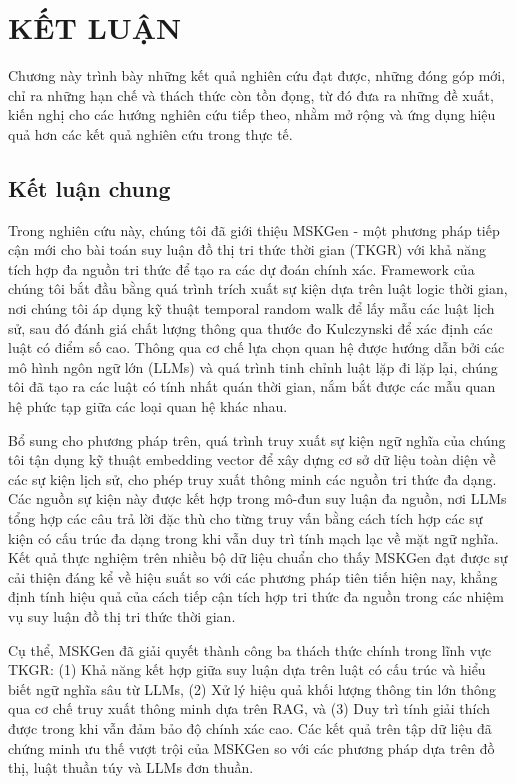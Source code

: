 \chapter{KẾT LUẬN}
\label{Chapter6}

Chương này trình bày những kết quả nghiên cứu đạt được, những đóng góp mới, chỉ ra những hạn chế và thách thức còn tồn đọng, từ đó đưa ra những đề xuất, kiến nghị cho các hướng nghiên cứu tiếp theo, nhằm mở rộng và ứng dụng hiệu quả hơn các kết quả nghiên cứu trong thực tế.

\section{Kết luận chung}
Trong nghiên cứu này, chúng tôi đã giới thiệu MSKGen - một phương pháp tiếp cận mới cho bài toán suy luận đồ thị tri thức thời gian (TKGR) với khả năng tích hợp đa nguồn tri thức để tạo ra các dự đoán chính xác. Framework của chúng tôi bắt đầu bằng quá trình trích xuất sự kiện dựa trên luật logic thời gian, nơi chúng tôi áp dụng kỹ thuật temporal random walk để lấy mẫu các luật lịch sử, sau đó đánh giá chất lượng thông qua thước đo Kulczynski để xác định các luật có điểm số cao. Thông qua cơ chế lựa chọn quan hệ được hướng dẫn bởi các mô hình ngôn ngữ lớn (LLMs) và quá trình tinh chỉnh luật lặp đi lặp lại, chúng tôi đã tạo ra các luật có tính nhất quán thời gian, nắm bắt được các mẫu quan hệ phức tạp giữa các loại quan hệ khác nhau.

Bổ sung cho phương pháp trên, quá trình truy xuất sự kiện ngữ nghĩa của chúng tôi tận dụng kỹ thuật embedding vector để xây dựng cơ sở dữ liệu toàn diện về các sự kiện lịch sử, cho phép truy xuất thông minh các nguồn tri thức đa dạng. Các nguồn sự kiện này được kết hợp trong mô-đun suy luận đa nguồn, nơi LLMs tổng hợp các câu trả lời đặc thù cho từng truy vấn bằng cách tích hợp các sự kiện có cấu trúc đa dạng trong khi vẫn duy trì tính mạch lạc về mặt ngữ nghĩa. Kết quả thực nghiệm trên nhiều bộ dữ liệu chuẩn cho thấy MSKGen đạt được sự cải thiện đáng kể về hiệu suất so với các phương pháp tiên tiến hiện nay, khẳng định tính hiệu quả của cách tiếp cận tích hợp tri thức đa nguồn trong các nhiệm vụ suy luận đồ thị tri thức thời gian.

Cụ thể, MSKGen đã giải quyết thành công ba thách thức chính trong lĩnh vực TKGR: (1) Khả năng kết hợp giữa suy luận dựa trên luật có cấu trúc và hiểu biết ngữ nghĩa sâu từ LLMs, (2) Xử lý hiệu quả khối lượng thông tin lớn thông qua cơ chế truy xuất thông minh dựa trên RAG, và (3) Duy trì tính giải thích được trong khi vẫn đảm bảo độ chính xác cao. Các kết quả trên tập dữ liệu đã chứng minh ưu thế vượt trội của MSKGen so với các phương pháp dựa trên đồ thị, luật thuần túy và LLMs đơn thuần.


